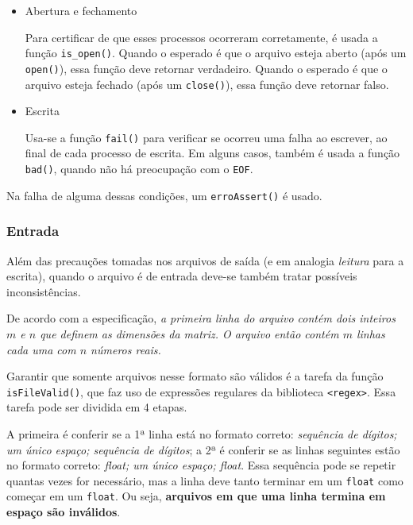 \documentclass{article}
\def\code#1{\texttt{#1}}
\begin{document}
\begin{itemize}

    \item Abertura e fechamento 

        Para certificar de que esses processos ocorreram corretamente, é usada a função \code{is\_open()}. Quando o esperado é que o arquivo esteja aberto (após um \code{open()}), essa função deve retornar verdadeiro. Quando o esperado é que o arquivo esteja fechado (após um \code{close()}), essa função deve retornar falso. 

    \item Escrita

        Usa-se a função \code{fail()} para verificar se ocorreu uma falha ao escrever, ao final de cada processo de escrita. Em alguns casos, também é usada a função \code{bad()}, quando não há preocupação com o \code{EOF}.

\end{itemize}

Na falha de alguma dessas condições, um \code{erroAssert()} é usado.

\subsubsection{Entrada}

Além das precauções tomadas nos arquivos de saída (e em analogia \textit{leitura} para a escrita), quando o arquivo é de entrada deve-se também tratar possíveis inconsistências. 

De acordo com a especificação, \textit{a primeira linha do arquivo contém dois inteiros \( m \) e \( n \) que definem as dimensões da matriz. O arquivo então contém \( m \) linhas cada uma com \( n \) números reais.}

Garantir que somente arquivos nesse formato são válidos é a tarefa da função \code{isFileValid()}, que faz uso de expressões regulares da biblioteca \code{<regex>}. Essa tarefa pode ser dividida em 4 etapas. 

A primeira é conferir se a 1ª linha está no formato correto: \textit{sequência de dígitos; um único espaço; sequência de dígitos}; a 2ª é conferir se as linhas seguintes estão no formato correto: \textit{float; um único espaço; float}. Essa sequência pode se repetir quantas vezes for necessário, mas a linha deve tanto terminar em um \code{float} como começar em um \code{float}. Ou seja, \textbf{arquivos em que uma linha termina em espaço são inválidos}.
\end{document}
